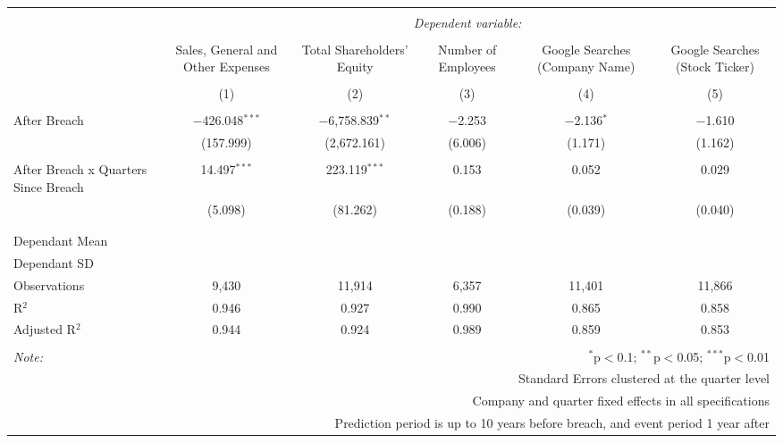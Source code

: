 
\begin{table}[!htbp] \centering 
  \caption{} 
  \label{} 
\begin{tabular}{@{\extracolsep{5pt}}lccccc} 
\\[-1.8ex]\hline 
\hline \\[-1.8ex] 
 & \multicolumn{5}{c}{\textit{Dependent variable:}} \\ 
\cline{2-6} 
\\[-1.8ex] & Sales, General and Other Expenses & Total Shareholders' Equity & Number of Employees & Google Searches (Company Name) & Google Searches (Stock Ticker) \\ 
\\[-1.8ex] & (1) & (2) & (3) & (4) & (5)\\ 
\hline \\[-1.8ex] 
 After Breach & $-$426.048$^{***}$ & $-$6,758.839$^{**}$ & $-$2.253 & $-$2.136$^{*}$ & $-$1.610 \\ 
  & (157.999) & (2,672.161) & (6.006) & (1.171) & (1.162) \\ 
  & & & & & \\ 
 After Breach x Quarters Since Breach & 14.497$^{***}$ & 223.119$^{***}$ & 0.153 & 0.052 & 0.029 \\ 
  & (5.098) & (81.262) & (0.188) & (0.039) & (0.040) \\ 
  & & & & & \\ 
\hline \\[-1.8ex] 
Dependant Mean &  &  &  &  &  \\ 
Dependant SD &  &  &  &  &  \\ 
Observations & 9,430 & 11,914 & 6,357 & 11,401 & 11,866 \\ 
R$^{2}$ & 0.946 & 0.927 & 0.990 & 0.865 & 0.858 \\ 
Adjusted R$^{2}$ & 0.944 & 0.924 & 0.989 & 0.859 & 0.853 \\ 
\hline 
\hline \\[-1.8ex] 
\textit{Note:}  & \multicolumn{5}{r}{$^{*}$p$<$0.1; $^{**}$p$<$0.05; $^{***}$p$<$0.01} \\ 
 & \multicolumn{5}{r}{Standard Errors clustered at the quarter level} \\ 
 & \multicolumn{5}{r}{Company and quarter fixed effects in all specifications} \\ 
 & \multicolumn{5}{r}{Prediction period is up to 10 years before breach, and event period 1 year after} \\ 
\end{tabular} 
\end{table} 
